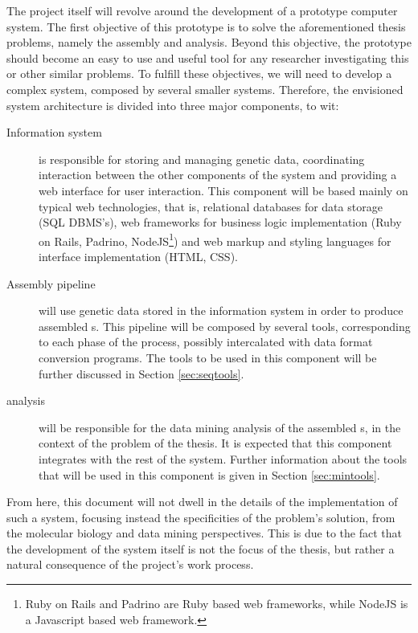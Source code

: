 The project itself will revolve around the development of a prototype computer
system. The first objective of this prototype is to solve the aforementioned
thesis problems, namely the \trans{} assembly and analysis. Beyond this
objective, the prototype should become an easy to use and useful tool for any
researcher investigating this or other similar problems. To fulfill these
objectives, we will need to develop a complex system, composed by several
smaller systems. Therefore, the envisioned system architecture is divided into
three major components, to wit:

\begin{description}

  \item[Information system]
  is responsible for storing and managing genetic data, coordinating interaction
  between the other components of the system and providing a web interface for
  user interaction. This component will be based mainly on typical web
  technologies, that is, relational databases for data storage (SQL DBMS's), web
  frameworks for business logic implementation (Ruby on Rails, Padrino,
  NodeJS\footnote{Ruby on Rails and Padrino are Ruby based web frameworks, while
  NodeJS is a Javascript based web framework.}) and web markup and styling
  languages for interface implementation (HTML, CSS).

  \item[Assembly pipeline]
  will use genetic data stored in the information system in order to produce
  assembled \trans s. This pipeline will be composed by several tools,
  corresponding to each phase of the \rnaseq{} process, possibly intercalated
  with data format conversion programs. The tools to be used in this component
  will be further discussed in Section \ref{sec:seqtools}.

  \item[\Trans{} analysis]
  will be responsible for the data mining analysis of the assembled \trans s, in
  the context of the problem of the thesis. It is expected that this component
  integrates with the rest of the system. Further information about the tools
  that will be used in this component is given in Section \ref{sec:mintools}.

\end{description}

From here, this document will not dwell in the details of the implementation of
such a system, focusing instead the specificities of the problem's solution,
from the molecular biology and data mining perspectives. This is due to the fact
that the development of the system itself is not the focus of the thesis, but
rather a natural consequence of the project's work process.

